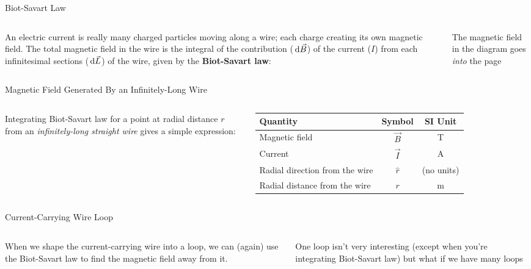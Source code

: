 \documentclass[12pt,aspectratio=169]{beamer}
\begin{document}
\begin{frame}{Biot-Savart Law}
  \begin{columns}
    
    An electric current is really many charged particles moving along a wire;
    each charge creating its own magnetic field.
    The total magnetic field in the wire is the integral of the contribution
    ($\dl{\vec B}$) of the current ($I$) from each infinitesimal sections
    ($\dl{\vec L}$) of the wire, given by the \textbf{Biot-Savart law}:
  

    The magnetic field in the diagram goes \emph{into} the page
  \end{columns}
\end{frame}



\begin{frame}{Magnetic Field Generated By an Infinitely-Long Wire}
  \begin{columns}
    
    Integrating Biot-Savart law for a point at radial distance $r$ from an
    \emph{infinitely-long straight wire} gives a simple expression:


    \begin{tabular}{l|c|c}
      \rowcolor{pink}
      \textbf{Quantity} & \textbf{Symbol} & \textbf{SI Unit} \\ \hline
      Magnetic field      & $\vec B$ & \si\tesla \\
      Current             & $\vec I$ & \si\ampere \\
      Radial direction from the wire & $\hat r$ & (no units)\\
      Radial distance from the wire  & $r$      & \si\metre
    \end{tabular}
  \end{columns}
\end{frame}


\begin{frame}{Current-Carrying Wire Loop}
  \begin{columns}

    When we shape the current-carrying wire into a loop, we can (again) use
    the Biot-Savart law to find the magnetic field away from it.

    \vspace{.2in}
    One loop isn't very interesting (except when you're integrating Biot-Savart
    law) but what if we have many loops
  \end{columns}
\end{frame}
\end{document}
